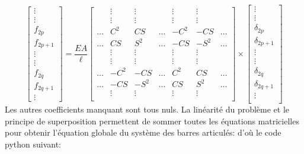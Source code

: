 \documentclass[a4paper]{article}
\begin{document}
\[
\begin{bmatrix}
  \vdots\\
 \vdots\\
     f_{2p} \\
    f_{2p+1} \\
   \vdots\\
     \vdots\\
     f_{2q} \\
     f_{2q+1} \\
     \vdots
\end{bmatrix}
=\frac{E A}{\ell} 
\begin{bmatrix}
        & \vdots & \vdots & & \vdots& \vdots&  \\
        & \vdots & \vdots & & \vdots& \vdots&  \\
     \dots      & C^2 & CS & \dots & -C^2& -CS& \dots \\
    \dots       & CS & S^2& \dots & -CS& -S^2& \dots\\
        & \vdots & \vdots & & \vdots& \vdots&  \\
        & \vdots & \vdots & & \vdots& \vdots&  \\
     \dots      & -C^2 & -CS & \dots & C^2& CS& \dots\\
      \dots      & -CS & -S^2 & \dots & CS& S^2& \dots\\
        & \vdots & \vdots & & \vdots& \vdots&  \\

\end{bmatrix}
\times
\begin{bmatrix}
  \vdots\\
 \vdots\\
     \delta_{2p} \\
    \delta_{2p+1} \\
   \vdots\\
     \vdots\\
     \delta_{2q} \\
     \delta_{2q+1} \\
     \vdots\\
\end{bmatrix}
\]
Les autres coefficients manquant sont tous nuls. La linéarité du problème et le principe de superposition permettent de sommer toutes les équations matricielles pour obtenir l'équation globale du système des barres articulés: d'où le code python suivant:
\end{document}
